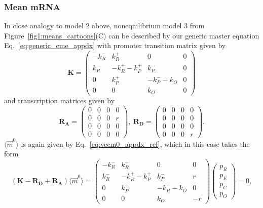 \subsubsection{Mean mRNA}
In close analogy to model 2 above, nonequilibrium model 3 from
Figure~\ref{fig1:means_cartoons}(C) can be described by our generic master
equation Eq.~\ref{eq:generic_cme_appdx} with promoter transition matrix given by
\begin{equation}
\mathbf{K} =
\begin{pmatrix} -k_R^- & k_R^+ & 0 & 0\\
        k_R^- & -k_R^+ -k_P^+ & k_P^- & 0 \\
        0 & k_P^+ & -k_P^- - k_O & 0 \\
        0 & 0 & k_O & 0
\end{pmatrix}
\end{equation}
and transcription matrices given by
\begin{equation}
\mathbf{R_A} =
\begin{pmatrix}
        0 & 0 & 0 & 0 \\ 
        0 & 0 & 0 & r \\ 
        0 & 0 & 0 & 0 \\ 
        0 & 0 & 0 & 0
\end{pmatrix},\
\mathbf{R_D} =
\begin{pmatrix}
        0 & 0 & 0 & 0 \\ 
        0 & 0 & 0 & 0 \\ 
        0 & 0 & 0 & 0 \\ 
        0 & 0 & 0 & r
\end{pmatrix}.
\end{equation}
$\langle\vec{m}^0\rangle$ is again given by Eq.~\ref{eq:vecm0_appdx_ref},
which in this case takes the form
\begin{equation}
(\mathbf{K} - \mathbf{R_D} + \mathbf{R_A}) \langle\vec{m}^0\rangle =
\begin{pmatrix} -k_R^- & k_R^+ & 0 & 0\\
    k_R^- & -k_R^+ -k_P^+ & k_P^- & r \\
    0 & k_P^+ & -k_P^- - k_O & 0 \\
    0 & 0 & k_O & - r
\end{pmatrix}
\begin{pmatrix} p_R \\ p_E \\ p_C \\ p_O
\end{pmatrix} = 0,
\end{equation}
